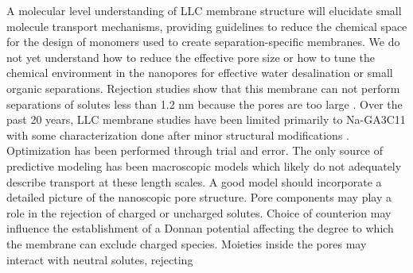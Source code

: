 A molecular level understanding of LLC membrane structure will elucidate
small molecule transport mechanisms, providing guidelines to reduce the
chemical space for the design of monomers used to create separation-specific
membranes. We do not yet understand how to reduce the effective pore
size or how to tune the chemical environment in the 
nanopores for effective water desalination or small organic separations.
Rejection studies show that this membrane can not perform separations of solutes less than 1.2 nm  
because the pores are too large \cite{zhou_supported_2005}. Over the past
20 years, LLC membrane studies have been limited primarily 
to Na-GA3C11 with some characterization done after minor structural 
modifications \cite{resel_structural_2000}. Optimization has been 
performed through trial and error. The only source of predictive modeling  %
has been macroscopic models which likely do not adequately describe 
transport at these length scales. A good model should incorporate a 
detailed picture of the nanoscopic pore structure. Pore components may 
play a role in the rejection of charged or uncharged solutes. Choice of 
counterion may influence the establishment of a Donnan potential
affecting the degree to which the membrane can exclude charged species.
Moieties inside the pores may interact with neutral solutes, rejecting
